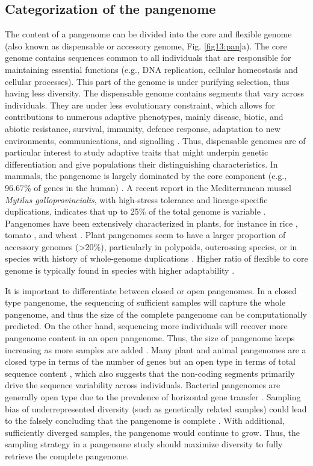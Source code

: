 \documentclass[../main.tex]{subfiles}
\begin{document}
\subsection*{Categorization of the pangenome}

The content of a pangenome can be divided into the core and flexible genome (also known  as dispensable or accessory genome, Fig. \ref{fig13:pan}a). The core genome contains sequences common to all individuals that are responsible for maintaining essential functions (e.g., DNA replication, cellular homeostasis and cellular processes). This part of the genome is under purifying selection, thus having less diversity. The dispensable genome contains segments that vary across individuals. They are under less evolutionary constraint, which allows for contributions to numerous adaptive phenotypes, mainly disease, biotic, and abiotic resistance, survival, immunity, defence response, adaptation to new environments, communications, and signalling \citep{golicz2020pangenomics}. Thus, dispensable genomes are of particular interest to study adaptive traits that might underpin genetic differentiation and give populations their distinguishing characteristics. In mammals, the pangenome is largely dominated by the core component (e.g., 96.67\% of genes in the human) \citep{duan2019hupan}. A recent report in the Mediterranean mussel \emph{Mytilus galloprovincialis}, with high-stress tolerance and lineage-specific duplications, indicates that up to 25\% of the total genome is variable \citep{gerdol2020massive}. Pangenomes have been extensively characterized in plants, for instance in rice \citep{zhao2018pan}, tomato \citep{gao2019tomato}, and wheat \citep{walkowiak2020multiple}. Plant pangenomes seem to have a larger proportion of accessory genomes (>20\%), particularly in polypoids, outcrossing species, or in species with history of whole-genome duplications \citep{tao2019exploring}. Higher ratio of flexible to core genome is typically found in species with higher adaptability \citep{tranchant2018plant}. 

It is important to differentiate between closed or open pangenomes. In a closed type pangenome, the sequencing of sufficient samples will capture the whole pangenome, and thus the size of the complete pangenome can be computationally predicted. On the other hand, sequencing more individuals will recover more pangenome content in an open pangenome. Thus, the size of pangenome keeps increasing as more samples are added \citep{golicz2020pangenomics}. Many plant and animal pangenomes are a closed type in terms of the number of genes but an open type in terms of total sequence content \citep{duan2019hupan,golicz2020pangenomics}, which also suggests that the non-coding segments primarily drive the sequence variability across individuals. Bacterial pangenomes  are generally open type due to the prevalence of horizontal gene transfer \citep{soucy2015horizontal}. Sampling bias of underrepresented diversity (such as genetically related samples) could lead to the falsely concluding that the pangenome is complete \citep{tranchant2018plant}. With additional, sufficiently  diverged samples, the  pangenome would continue to grow. Thus, the sampling strategy in a pangenome study should maximize diversity to fully retrieve the complete pangenome. 
\end{document}
